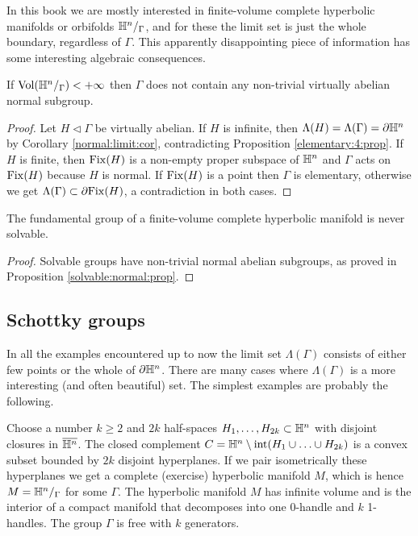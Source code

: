 In this book we are mostly interested in finite-volume complete hyperbolic manifolds or orbifolds $\mathbb{H}^n/_\Gamma$, and for these the limit set is just the whole boundary, regardless of $\Gamma$. This apparently disappointing piece of information has some interesting algebraic consequences. 

\begin{cor} \label{normal:abelian:cor}
If ${\rm Vol}(\mathbb{H}^n/_\Gamma) <+\infty$ then
$\Gamma$ does not contain any non-trivial virtually abelian normal subgroup.
\end{cor}
\begin{proof}
Let $H\triangleleft \Gamma$ be virtually abelian. If $H$ is infinite, then $\Lambda(H) = \Lambda (\Gamma)=\partial \mathbb{H}^n$ by Corollary \ref{normal:limit:cor}, contradicting Proposition \ref{elementary:4:prop}. If $H$ is finite, then ${\rm Fix}(H)$ is a non-empty proper subspace of $\mathbb{H}^n$ and $\Gamma$ acts on ${\rm Fix}(H)$ because $H$ is normal. If ${\rm Fix}(H)$ is a point then $\Gamma$ is elementary, otherwise we get $\Lambda(\Gamma) \subset \partial {\rm Fix}(H)$, a contradiction in both cases.
\end{proof}

\begin{cor}
The fundamental group of a finite-volume complete hyperbolic manifold is never solvable.
\end{cor}
\begin{proof}
Solvable groups have non-trivial normal abelian subgroups, as proved in Proposition \ref{solvable:normal:prop}.
\end{proof}

\subsection{Schottky groups}
In all the examples encountered up to now the limit set $\Lambda(\Gamma)$ consists of either few points or the whole of $\partial \mathbb{H}^n$. There are many cases where $\Lambda(\Gamma)$ is a more interesting (and often beautiful) set. The simplest examples are probably the following.

Choose a number $k\geqslant 2$ and $2k$ half-spaces $H_1,\ldots,H_{2k} \subset \mathbb{H}^n$ with disjoint closures in $\overline{\mathbb{H}^n}$. 
The closed complement $C = \mathbb{H}^n \setminus {\rm int}(H_1 \cup \ldots \cup H_{2k})$ is a convex subset bounded by $2k$ disjoint hyperplanes. If we pair isometrically these hyperplanes we get a complete (exercise) hyperbolic manifold $M$, which is hence $M=\mathbb{H}^n/_\Gamma$ for some $\Gamma$. The hyperbolic manifold $M$ has infinite volume and is the interior of a compact manifold that decomposes into one 0-handle and $k$ 1-handles. The group $\Gamma$ is free with $k$ generators.

